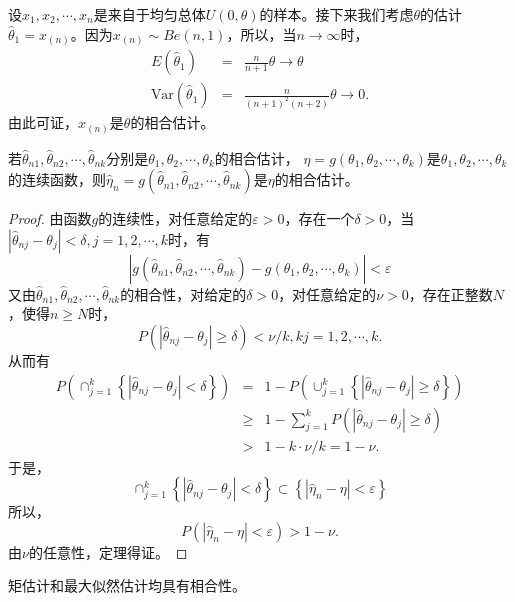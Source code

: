 \begin{example}
    设$x_1,x_2,\cdots,x_n$是来自于均匀总体$U(0,\theta)$的样本。接下来我们考虑$\theta$的估计$\hat{\theta}_1 = x_{(n)}$。因为$x_{(n)} \sim Be(n,1)$，所以，当$n\rightarrow \infty$时，
    \begin{eqnarray*}
        E(\hat{\theta}_1) &=& \frac{n}{n+1}\theta \rightarrow \theta \\
        \text{Var}(\hat{\theta}_1) &=& \frac{n}{(n+1)^2 (n+2)}\theta \rightarrow 0.
    \end{eqnarray*} 
    由此可证，$x_{(n)}$是$\theta$的相合估计。
\end{example}
\begin{theorem}
    若$\hat{\theta}_{n1},\hat{\theta}_{n2},\cdots,\hat{\theta}_{nk}$分别是$\theta_1,\theta_2,\cdots,\theta_k$的相合估计， $\eta = g(\theta_1,\theta_2,\cdots,\theta_k)$是$\theta_1,\theta_2,\cdots,\theta_k$的连续函数，则$\hat{\eta}_n =g(\hat{\theta}_{n1},\hat{\theta}_{n2},\cdots,\hat{\theta}_{nk})$是$\eta$的相合估计。
\end{theorem}
\begin{proof}
    由函数$g$的连续性，对任意给定的$\varepsilon > 0$，存在一个$\delta>0$，当$|\hat{\theta}_{nj}-\theta_j|< \delta,j=1,2,\cdots,k$时，有
    $$
    \left| g(\hat{\theta}_{n1},\hat{\theta}_{n2},\cdots,\hat{\theta}_{nk})-g(\theta_{1},\theta_2,\cdots,\theta_{k}) \right| < \varepsilon
    $$
    又由$\hat{\theta}_{n1},\hat{\theta}_{n2},\cdots,\hat{\theta}_{nk}$的相合性，对给定的$\delta>0$，对任意给定的$\nu>0$，存在正整数$N$，使得$n\geq N$时，
    $$
    P\left( \left| \hat{\theta}_{nj} - \theta_j \right| \geq \delta \right) < \nu /k, kj=1,2,\cdots,k.
    $$
    从而有
    \begin{eqnarray*}
        P\left( \cap_{j=1}^k  \left\{\left| \hat{\theta}_{nj} - \theta_j \right| <\delta\right\} \right) &=& 1 - P\left( \cup_{j=1}^k \left\{ \left| \hat{\theta}_{nj} - \theta_j \right| \geq \delta \right\}\right)\\
        &\geq & 1 - \sum_{j=1}^k P\left(   \left| \hat{\theta}_{nj} - \theta_j \right| \geq \delta \right)\\
        &> & 1- k \cdot \nu /k = 1-\nu.
    \end{eqnarray*}
    于是，
    $$
    \cap_{j=1}^k  \left\{\left| \hat{\theta}_{nj} - \theta_j \right| <\delta\right\} \subset \left\{ |\hat{\eta}_n - \eta|< \varepsilon \right\}
    $$
    所以，
    $$
    P(|\hat{\eta}_n - \eta|< \varepsilon ) > 1-\nu.
    $$
    由$\nu$的任意性，定理得证。
\end{proof}
\begin{remark}
矩估计和最大似然估计均具有相合性。
\end{remark}

